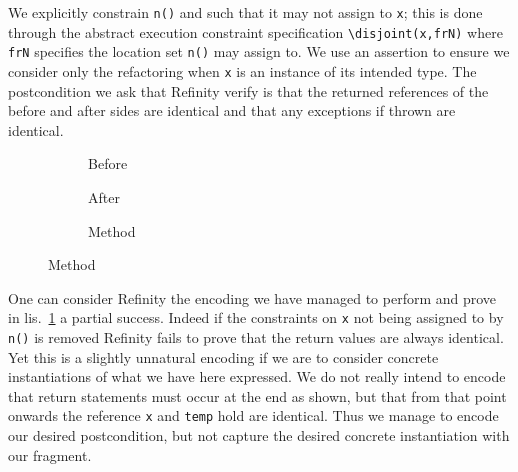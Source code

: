 We explicitly constrain \lstinline[style=refinity]|n()| and such that it may not assign to \lstinline[style=refinity]|x|; this is done through the abstract execution constraint specification \lstinline[style=refinity]|\disjoint(x,frN)|
where \lstinline[style=refinity]|frN| specifies the location set \lstinline[style=refinity]|n()| may assign to. We use an assertion to ensure we consider only the refactoring
when \lstinline[style=refinity]|x| is an instance of its intended type. The postcondition we ask that Refinity verify is that the returned references of the before and after
sides are identical and that any exceptions if thrown are identical.
\begin{figure}[!h]
  \centering
  \begin{subfigure}[b]{.34\linewidth}
    
    \caption{Before}
  \end{subfigure}\hspace{1cm}
  \begin{subfigure}[b]{.34\linewidth}
    
    \caption{After}
  \end{subfigure}\vspace{1mm}
  \begin{subfigure}[b]{.39\linewidth}
    
    \caption{Method}
  \end{subfigure}
\label{lst:ExtractVariable-refinity}
\end{figure}




One can consider Refinity the encoding we have managed to perform and prove in lis.~\ref{lst:ExtractVariable-refinity} a partial success. Indeed if the constraints on
\lstinline[style=refinity]|x| not being assigned to by \lstinline[style=refinity]|n()| is removed Refinity fails to prove that the return values are always identical.
Yet this is a slightly unnatural encoding if we are to consider concrete instantiations of what we have here expressed. We do not really intend to encode that return
statements must occur at the end as shown, but that from that point onwards the reference \lstinline[style=refinity]|x| and \lstinline[style=refinity]|temp| hold
are identical. Thus we manage to encode our desired postcondition, but not capture the desired concrete instantiation with our fragment.

